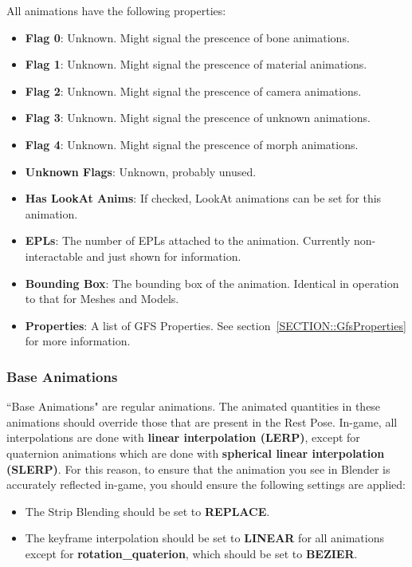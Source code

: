 \documentclass{article}
\begin{document}
All animations have the following properties:
\begin{itemize}
\item \textbf{Flag 0}: Unknown. Might signal the prescence of bone animations.
\item \textbf{Flag 1}: Unknown. Might signal the prescence of material animations.
\item \textbf{Flag 2}: Unknown. Might signal the prescence of camera animations.
\item \textbf{Flag 3}: Unknown. Might signal the prescence of unknown animations.
\item \textbf{Flag 4}: Unknown. Might signal the prescence of morph animations.
\item \textbf{Unknown Flags}: Unknown, probably unused.
\item \textbf{Has LookAt Anims}: If checked, LookAt animations can be set for this animation.
\item \textbf{EPLs}: The number of EPLs attached to the animation. Currently non-interactable and just shown for information.
\item \textbf{Bounding Box}: The bounding box of the animation. Identical in operation to that for Meshes and Models.
\item \textbf{Properties}: A list of GFS Properties. See section~\ref{SECTION::GfsProperties} for more information.
\end{itemize}

\subsubsection{Base Animations}
\label{SECTION::Edits::Animations::NormalAnimations}
``Base Animations" are regular animations. The animated quantities in these animations should override those that are present in the Rest Pose. In-game, all interpolations are done with \textbf{linear interpolation (LERP)}, except for quaternion animations which are done with \textbf{spherical linear interpolation (SLERP)}. For this reason, to ensure that the animation you see in Blender is accurately reflected in-game, you should ensure the following settings are applied:
\begin{itemize}
\item The Strip Blending should be set to \textbf{REPLACE}.
\item The keyframe interpolation should be set to \textbf{LINEAR} for all animations except for \textbf{rotation\_quaterion}, which should be set to \textbf{BEZIER}.
\end{itemize}
\end{document}
